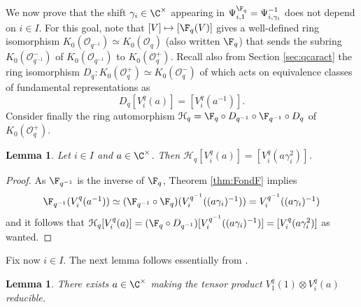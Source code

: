 \documentclass[11pt]{amsart}
\newtheorem{lem}[theorem]{Lemma}
\theoremstyle{definition}
\theoremstyle{remark}
\numberwithin{equation}{section}
\begin{document}
We now prove that the shift $\gamma_i\in \C^{\times}$ appearing in $\Psi_{i,1}^{\F_q}=\Psi_{i,\gamma_i}^{-1}$ does not depend on $i\in I$. For this goal, note that $[V]\mapsto [\F_q(V)]$ gives a well-defined ring isomorphism $K_0(\mathcal{O}_{q^{-1}})\simeq K_0(\mathcal{O}_q)$ (also written $\F_q$) that sends the subring $K_0(\mathcal{O}_{q^{-1}}^{-})$ of $K_0(\mathcal{O}_{q^{-1}})$ to $K_0(\mathcal{O}_q^{+})$. Recall also from Section \ref{sec:qcaract} the ring isomorphism $D_q: K_0(\mathcal{O}_q^+)\simeq K_0(\mathcal{O}_q^-)$ of \cite{hl2} which acts on equivalence classes of fundamental representations as 
$$D_q[V_i^q(a)] = [V_i^q(a^{-1})].$$ Consider finally the ring automorphism $\mathcal{H}_q=\F_q\circ D_{q^{-1}}\circ \F_{q^{-1}}\circ D_{q}$ of $K_0(\mathcal{O}_q^+)$.
\begin{lem}\label{lem:Hq} Let $i\in I$ and $a \in \C^{\times}$. Then $\mathcal{H}_q[V_i^q(a)] = [V_i^q(a\gamma_i^2)]$.
\end{lem}
\begin{proof} As $\F_{q^{-1}}$ is the inverse of $\F_q$, Theorem \ref{thm:FondF} implies 
$$ \textstyle \F_{q^{-1}}(V_i^q(a^{-1})) \simeq (\F_{q^{-1}}\circ \F_q)(V_i^{q^{-1}}((a\gamma_i)^{-1})) = V_i^{q^{-1}}((a\gamma_i)^{-1})$$ 
and it follows that
$ \mathcal{H}_q [V_i^q(a)] = (\F_q\circ D_{q^{-1}})[V_i^{q^{-1}}((a\gamma_i)^{-1})]=[V_i^q(a\gamma_i^2)]$ as wanted.
\end{proof}
Fix now $i\in I$. The next lemma follows essentially from \cite{fm}.
\begin{lem}\label{lemma:redTP} There exists $a\in\C^{\times}$ making the tensor product $V_{1}^q(1)\otimes V_i^q(a)$ reducible. 
\end{lem}
\end{document}
